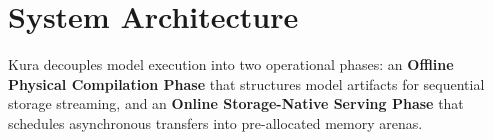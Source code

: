 \section{System Architecture}
\label{sec:architecture}

Kura decouples model execution into two operational phases: an \textbf{Offline Physical Compilation Phase} that structures model artifacts for sequential storage streaming, and an \textbf{Online Storage-Native Serving Phase} that schedules asynchronous transfers into pre-allocated memory arenas.

